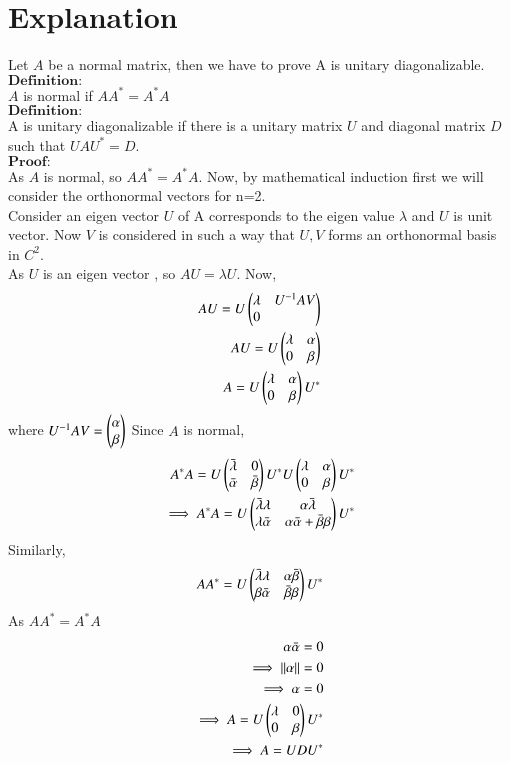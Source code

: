\documentclass[journal,12pt,twocolumn]{IEEEtran}
\begin{document}
\section{Explanation}
Let $A$ be a normal matrix, then we have to prove A is unitary diagonalizable.\\
$\textbf{Definition:}$\\
$A$ is normal if $A A^* = A^* A$\\
$\textbf{Definition:}$\\
A is unitary diagonalizable if there is a unitary matrix $U$ and diagonal matrix $D$ such that $UAU^* = D$.\\
$\textbf{Proof:}$\\
As $A$ is normal, so $A A^* = A^* A$. Now, by mathematical induction first we will consider the orthonormal vectors for n=2.\\
Consider an eigen vector $U$ of A corresponds to the eigen value $\lambda$ and $U$ is unit vector. Now $V$ is considered in such a way that ${U, V}$ forms an orthonormal basis in $C^2$.\\
As $U$ is an eigen vector , so $AU=\lambda U$.
Now,
\begin{align}
AU = U \begin{pmatrix}\lambda & U^{-1}AV\\0\end{pmatrix}\\
AU = U \begin{pmatrix}\lambda & \alpha\\0 & \beta\end{pmatrix}\\
A = U \begin{pmatrix}\lambda & \alpha\\0 & \beta\end{pmatrix} U^*
\end{align}
where $U^{-1}AV = \begin{pmatrix}\alpha\\\beta\end{pmatrix}$
Since $A$ is normal, 
\begin{align}
A^* A = U \begin{pmatrix}\bar{\lambda} & 0\\\bar{\alpha} & \bar{\beta}\end{pmatrix} U^* U \begin{pmatrix}\lambda & \alpha\\0 & \beta\end{pmatrix} U^*\\
\implies A^* A = U \begin{pmatrix}\bar{\lambda}\lambda & \alpha\bar{\lambda}\\\lambda\bar{\alpha} & \alpha\bar{\alpha}+\bar{\beta}\beta\end{pmatrix}U^*
\end{align}
Similarly,
\begin{align}
A A^* =  U \begin{pmatrix}\bar{\lambda}\lambda & \alpha\bar{\beta}\\\beta\bar{\alpha} & \bar{\beta}\beta\end{pmatrix}U^*
\end{align}
As $A A^* = A^* A$
\begin{align}
\alpha\bar{\alpha} = 0\\
\implies \left\lVert\alpha\right\rVert = 0\\
\implies \alpha =0\\
\implies A = U \begin{pmatrix}\lambda & 0\\0 & \beta\end{pmatrix} U^*\\
\implies A = U D U^*
\end{align}
\end{document}

